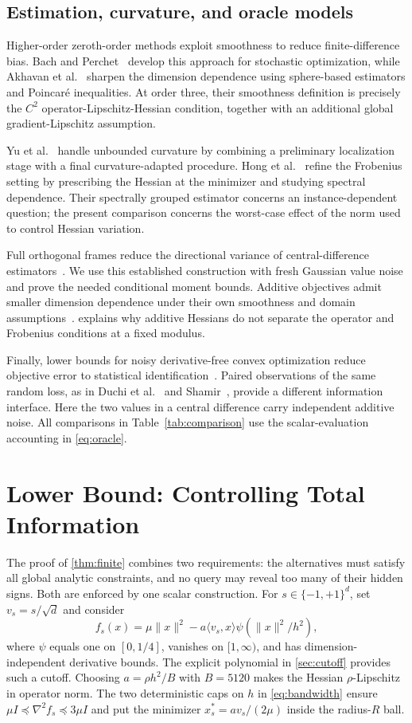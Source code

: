 \documentclass[11pt,a4paper]{article}
\theoremstyle{definition}
\theoremstyle{remark}
\begin{document}
\subsection{Estimation, curvature, and oracle models}
Higher-order zeroth-order methods exploit smoothness to reduce finite-difference bias. Bach and Perchet~\cite{Bach2016} develop this approach for stochastic optimization, while Akhavan et al.~\cite{Akhavan2024} sharpen the dimension dependence using sphere-based estimators and Poincar\'e inequalities. At order three, their smoothness definition is precisely the $C^2$ operator-Lipschitz-Hessian condition, together with an additional global gradient-Lipschitz assumption.

Yu et al.~\cite{Yu2024} handle unbounded curvature by combining a preliminary localization stage with a final curvature-adapted procedure. Hong et al.~\cite{Hong2025} refine the Frobenius setting by prescribing the Hessian at the minimizer and studying spectral dependence. Their spectrally grouped estimator concerns an instance-dependent question; the present comparison concerns the worst-case effect of the norm used to control Hessian variation.

Full orthogonal frames reduce the directional variance of central-difference estimators~\cite{Feng2023}. We use this established construction with fresh Gaussian value noise and prove the needed conditional moment bounds. Additive objectives admit smaller dimension dependence under their own smoothness and domain assumptions~\cite{Akhavan2025}.  explains why additive Hessians do not separate the operator and Frobenius conditions at a fixed modulus.

Finally, lower bounds for noisy derivative-free convex optimization reduce objective error to statistical identification~\cite{Shamir2013}. Paired observations of the same random loss, as in Duchi et al.~\cite{Duchi2015} and Shamir~\cite{Shamir2017}, provide a different information interface. Here the two values in a central difference carry independent additive noise. All comparisons in Table~\ref{tab:comparison} use the scalar-evaluation accounting in \eqref{eq:oracle}.

\FloatBarrier
\section{Lower Bound: Controlling Total Information}
\label{sec:lower-overview}
The proof of \cref{thm:finite} combines two requirements: the alternatives must satisfy all global analytic constraints, and no query may reveal too many of their hidden signs. Both are enforced by one scalar construction. For $s\in\{-1,+1\}^d$, set $v_s=s/\sqrt d$ and consider
\[
 f_s(x)=\mu\|x\|^2-a\langle v_s,x\rangle\psi(\|x\|^2/h^2),
\]
where $\psi$ equals one on $[0,1/4]$, vanishes on $[1,\infty)$, and has dimension-independent derivative bounds. The explicit polynomial in \cref{sec:cutoff} provides such a cutoff. Choosing $a=\rho h^2/B$ with $B=5120$ makes the Hessian $\rho$-Lipschitz in operator norm. The two deterministic caps on $h$ in \eqref{eq:bandwidth} ensure $\mu I\preceq\nabla^2f_s\preceq3\mu I$ and put the minimizer $x_s^*=av_s/(2\mu)$ inside the radius-$R$ ball.
\end{document}
